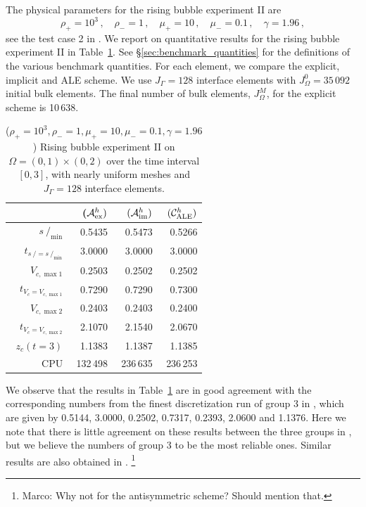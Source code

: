 \documentclass[a4paper,12pt,onecolumn]{article}
\newcommand{\strikes}{\mbox{$s\!\!\!\!\:/$}}
\newcommand{\schemeAex}{{\mathcal{A}^h_{\rm ex}}}
\newcommand{\schemeAim}{{\mathcal{A}^h_{\rm im}}}
\newcommand{\schemeALE}{{\mathcal{C}^h_{\rm ALE}}}
\begin{document}
The physical parameters for the rising bubble experiment II are
\begin{equation} \label{eq:Hysing2}
\rho_+ = 10^3\,,\quad \rho_- = 1\,,\quad \mu_+ = 10\,,\quad \mu_- = 0.1\,,\quad
\gamma = 1.96\,,
\end{equation}
see the test case 2 in \cite[Table~I]{HysingTKPBGT09}. We report on
quantitative results for the rising bubble experiment II in
Table~\ref{tab:risingbubbleII}. See \S\ref{sec:benchmark_quantities} for the
definitions of the various benchmark quantities. For each element, we compare
the explicit, implicit and ALE scheme. We use $J_\Gamma=128$ interface elements
with $J_\Omega^0=35\,092$ initial bulk elements. The final number of bulk
elements, $J_\Omega^M$, for the explicit scheme is 10\,638.
\begin{table}
\center
\hspace*{-3.25cm}
\begin{tabular}{rrrr}
\hline
& ($\schemeAex)$ & $(\schemeAim)$ & $(\schemeALE)$ \\
\hline
$\strikes_{\min}$                & 0.5435 & 0.5473 & 0.5266 \\
$t_{\strikes = \strikes_{\min}}$ & 3.0000 & 3.0000 & 3.0000 \\
$V_{c,\max 1}$                   & 0.2503 & 0.2502 & 0.2502 \\
$t_{V_c = V_{c,\max 1}}$         & 0.7290 & 0.7290 & 0.7300 \\
$V_{c,\max 2}$                   & 0.2403 & 0.2403 & 0.2400 \\
$t_{V_c = V_{c,\max 2}}$         & 2.1070 & 2.1540 & 2.0670 \\
$z_c(t=3)$                       & 1.1383 & 1.1387 & 1.1385 \\
CPU                              & 132\,498 & 236\,635 & 236\,253 \\
\hline
\end{tabular}
\hspace*{-3.25cm}
\caption[Navier--Stokes rising bubble II benchmark values]
{($\rho_+ = 10^3,\rho_- = 1,\mu_+ = 10,\mu_- =0.1,\gamma = 1.96$)
Rising bubble experiment II on $\Omega = (0,1) \times (0,2)$ over the time
interval $[0,3]$, with nearly uniform meshes and $J_\Gamma=128$ interface
elements.}
\label{tab:risingbubbleII}
\end{table}
We observe that the results in Table~\ref{tab:risingbubbleII}
are in good agreement with the corresponding numbers from the finest
discretization run of group 3 in \cite{HysingTKPBGT09}, which are given by
0.5144, 3.0000, 0.2502, 0.7317, 0.2393, 2.0600 and 1.1376. Here we note that
there is little agreement on these results between the three groups in
\cite{HysingTKPBGT09}, but we believe the numbers of group 3 to be the most
reliable ones. Similar results are also obtained in
\cite[Tables~5 and 6]{fluidfbp}.
\footnote{Marco: Why not for the antisymmetric scheme? Should mention that.}
\end{document}
